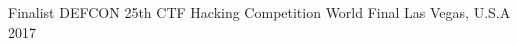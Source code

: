 
\begin{cvhonors}

  \cvhonor
  {Finalist} %
  {DEFCON 25th CTF Hacking Competition World Final} %
  {Las Vegas, U.S.A} %
  {2017} %

\end{cvhonors}


